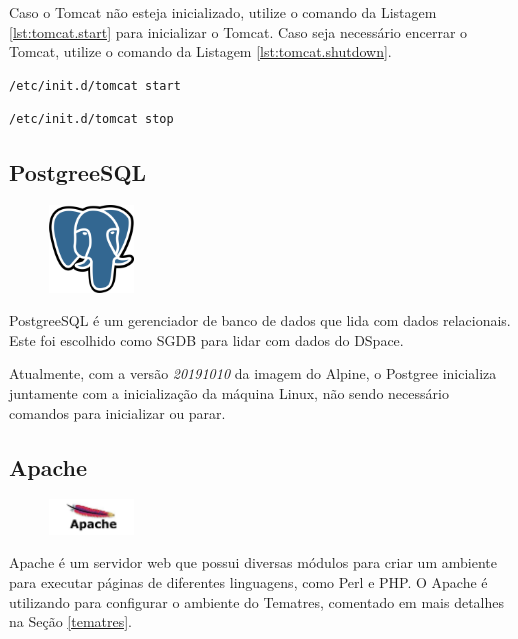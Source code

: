 Caso o Tomcat não esteja inicializado, utilize o comando da Listagem \ref{lst:tomcat.start} para inicializar o Tomcat. Caso seja necessário encerrar o Tomcat, utilize o comando da Listagem \ref{lst:tomcat.shutdown}.

\begin{lstlisting}[language=bash, label=lst:tomcat.start, caption=Inicializando Tomcat.]
    /etc/init.d/tomcat start
\end{lstlisting}

\begin{lstlisting}[language=bash, label=lst:tomcat.shutdown, caption=Encerrando Tomcat.]
    /etc/init.d/tomcat stop
\end{lstlisting}

\subsection{PostgreeSQL}\label{postgree}
\begin{figure} %
    \centering
    \includegraphics[width=0.2\textwidth]{../images/postgree.png}
\end{figure}
PostgreeSQL é um gerenciador de banco de dados que lida com dados relacionais. Este foi escolhido como SGDB para lidar com dados do DSpace.

Atualmente, com a versão \textit{20191010} da imagem do Alpine, o Postgree inicializa juntamente com a inicialização da máquina Linux, não sendo necessário comandos para inicializar ou parar.


\subsection{Apache}\label{apache}
\begin{figure} %
    \centering
    \includegraphics[width=0.2\textwidth]{../images/apache.jpg}
\end{figure}
Apache é um servidor web que possui diversas módulos para criar um ambiente para executar páginas de diferentes linguagens, como Perl e PHP.
O Apache é utilizando para configurar o ambiente do Tematres, comentado em mais detalhes na Seção \ref{tematres}. 

